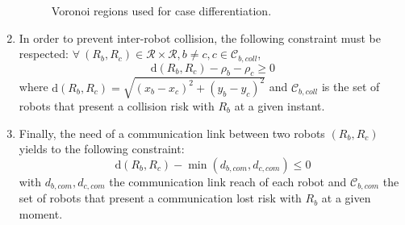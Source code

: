 \begin{enumerate}
\begin{figure}[!h]
{}
	\caption{Voronoi regions used for case differentiation. \label{fig:convexpolygon}}
	\end{figure}

    \item 
    In order to prevent inter-robot collision, the following constraint must be respected:
    $\forall\ (R_b, R_c) \in \mathcal{R} \times \mathcal{R}, b\neq c, c \in \mathcal{C}_{b,coll}$,
    \begin{equation}\label{eq:coll}
	    \mathrm{d}(R_b,R_c) - \rho_b -\rho_c \geq 0
    \end{equation}
    where $\mathrm{d}(R_b,R_c) = \sqrt{(x_{b} - x_{c})^2 + (y_{b} - y_{c})^2}$ and
    $\mathcal{C}_{b,coll}$ is the set of robots that present a collision risk with
    $R_b$ at a given instant. %
    
    \item Finally, the need of a communication link between two robots $(R_b, R_c)$ yields to
    the following constraint:
    \begin{equation}\label{eq:com}
    	\mathrm{d}(R_b,R_c)  - \min(d_{b,com}, d_{c,com}) \leq 0
    \end{equation}
    with $d_{b,com}, d_{c,com}$ the communication link reach of each robot and
    $\mathcal{C}_{b,com}$ the set of robots that present a communication lost risk with
    $R_b$ at a given moment.
\end{enumerate}



